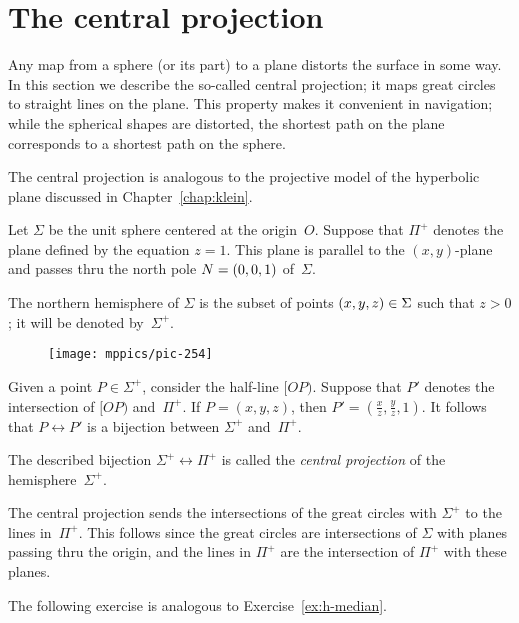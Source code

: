 \section{The central projection}

Any map from a sphere (or its part) to a plane distorts the surface in some way.
In this section we describe the so-called central projection; it maps great circles to straight lines on the plane.
This property makes it convenient in navigation;
while the spherical shapes are distorted, the shortest path on the plane corresponds to a shortest path on the sphere.

The central projection is analogous to the projective model of the hyperbolic plane discussed in Chapter~\ref{chap:klein}.

Let $\Sigma$ be the unit sphere centered at the origin~$O$.
Suppose that $\Pi^+$ denotes the plane defined by the equation $z=1$.
This plane is parallel to the $(x,y)$-plane and passes thru 
the north pole $N=(0,0,1)$ of~$\Sigma$.

The northern hemisphere of $\Sigma$
is the subset of points $(x,y,z)\in \Sigma$ such that $z>0$; it will be denoted by~$\Sigma^+$.

\begin{wrapfigure}{o}{40mm}
\centering
\vskip-3mm
\texttt{[image: mppics/pic-254]}
\end{wrapfigure}

Given a point $P\in \Sigma^+$, consider the half-line $[OP)$. 
Suppose that $P'$ denotes the intersection of $[OP)$ and~$\Pi^+$.
If $P=(x,y,z)$, then $P'=(\tfrac xz,\tfrac yz,1)$.
It follows that $P\leftrightarrow P'$ is a bijection between $\Sigma^+$ and~$\Pi^+$.



The described bijection $\Sigma^+\leftrightarrow \Pi^+$ is called the \emph{central projection} of 
the hemisphere~$\Sigma^+$.

The central projection sends the intersections of the great circles with $\Sigma^+$ to the lines in~$\Pi^+$.
This follows since the great circles are intersections of $\Sigma$ with planes passing thru the origin,
and the lines in $\Pi^+$ are the intersection of $\Pi^+$ with these planes.

The following exercise 
is analogous to Exercise~\ref{ex:h-median}.

